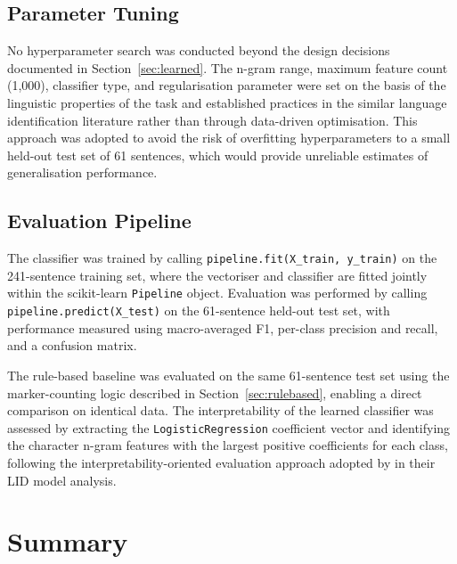 \documentclass[11pt,a4paper]{article}
\begin{document}
\subsection{Parameter Tuning}

No hyperparameter search was conducted beyond the design decisions
documented in Section~\ref{sec:learned}. The n-gram range, maximum
feature count (1,000), classifier type, and regularisation
parameter were set on the basis of the linguistic properties of
the task and established practices in the similar language
identification literature \citep{cianflone2016n,
de2024data} rather than through data-driven optimisation.
This approach was adopted to avoid the risk of overfitting
hyperparameters to a small held-out test set of 61 sentences, which
would provide unreliable estimates of generalisation performance.

\subsection{Evaluation Pipeline}
The classifier was trained by calling \texttt{pipeline.fit(X\_train,
y\_train)} on the 241-sentence training set, where the vectoriser
and classifier are fitted jointly within the scikit-learn
\texttt{Pipeline} object. Evaluation was performed by calling
\texttt{pipeline.predict(X\_test)} on the 61-sentence held-out test
set, with performance measured using macro-averaged F1, per-class
precision and recall, and a confusion matrix.

The rule-based baseline was evaluated on the same 61-sentence test
set using the marker-counting logic described in
Section~\ref{sec:rulebased}, enabling a direct comparison on
identical data. The interpretability of the learned classifier was
assessed by extracting the \texttt{LogisticRegression} coefficient
vector and identifying the character n-gram features with the
largest positive coefficients for each class, following the
interpretability-oriented evaluation approach adopted by
\citet{de2024data} in their LID model analysis.

\section{Summary}


  
\end{document}
